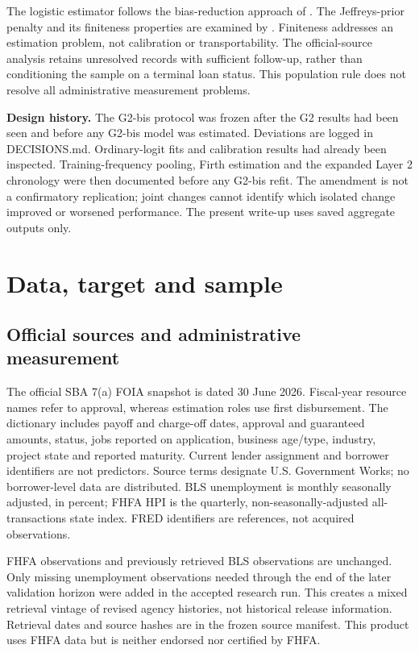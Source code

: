 The logistic estimator follows the bias-reduction approach of \citet{firth1993}. The Jeffreys-prior penalty and its finiteness properties are examined by \citet{kosmidis2021}. Finiteness addresses an estimation problem, not calibration or transportability. The official-source analysis retains unresolved records with sufficient follow-up, rather than conditioning the sample on a terminal loan status. This population rule does not resolve all administrative measurement problems.

\textbf{Design history.} The G2-bis protocol was frozen after the G2 results had been seen and before any G2-bis model was estimated. Deviations are logged in DECISIONS.md. Ordinary-logit fits and calibration results had already been inspected. Training-frequency pooling, Firth estimation and the expanded Layer 2 chronology were then documented before any G2-bis refit. The amendment is not a confirmatory replication; joint changes cannot identify which isolated change improved or worsened performance. The present write-up uses saved aggregate outputs only.

\section{Data, target and sample}
\subsection{Official sources and administrative measurement}
The official SBA 7(a) FOIA snapshot is dated 30 June 2026. Fiscal-year resource names refer to approval, whereas estimation roles use first disbursement. The dictionary includes payoff and charge-off dates, approval and guaranteed amounts, status, jobs reported on application, business age/type, industry, project state and reported maturity. Current lender assignment and borrower identifiers are not predictors. Source terms designate U.S. Government Works; no borrower-level data are distributed. BLS unemployment is monthly seasonally adjusted, in percent; FHFA HPI is the quarterly, non-seasonally-adjusted all-transactions state index. FRED identifiers are references, not acquired observations.

FHFA observations and previously retrieved BLS observations are unchanged. Only missing unemployment observations needed through the end of the later validation horizon were added in the accepted research run. This creates a mixed retrieval vintage of revised agency histories, not historical release information. Retrieval dates and source hashes are in the frozen source manifest. This product uses FHFA data but is neither endorsed nor certified by FHFA.

